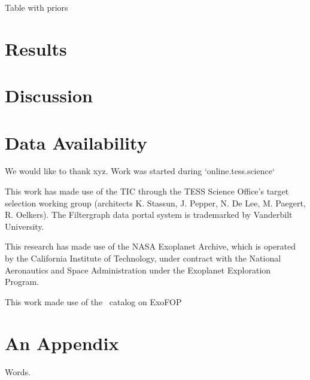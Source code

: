 \documentclass[linenumbers,floatfix,ApJL,twocolumn]{aastex631}
\begin{document}
Table with priors

%
%
%
%





\section{Results}

\section{Discussion}

\section{Data Availability}



\begin{acknowledgments}

We would like to thank xyz. 
Work was started during `online.tess.science`

This work has made use of the TIC through the TESS Science Office’s target selection working group (architects K. Stassun, J. Pepper, N. De Lee, M. Paegert, R. Oelkers). The Filtergraph data portal system is trademarked by Vanderbilt University.

This research has made use of the NASA Exoplanet Archive, which is operated by the California Institute of Technology, under contract with the National Aeronautics and Space Administration under the Exoplanet Exploration Program.

This work made use of the \tess\ catalog on ExoFOP

\end{acknowledgments}

\vspace{5mm}


\appendix

\section{An Appendix}

Words.

{}

\end{document}

